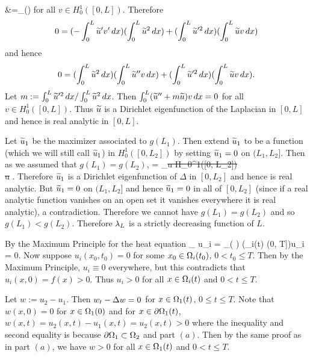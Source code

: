 &=\lim_{\vep {}}\bigg(\bigg)
\ea
for all $v \in H_{0}^{1}([0, L])$. Therefore
$$0 = (-\int_{0}^{L}\widetilde{u}'v'\, dx)(\int_{0}^{L}\widetilde{u}^{2}\, dx) + (\int_{0}^{L}\widetilde{u}'^{2}\, dx)(\int_{0}^{L}\widetilde{u}v\, dx)$$
and hence
$$0 = (\int_{0}^{L}\widetilde{u}^{2}\, dx)(\int_{0}^{L}\widetilde{u}''v\, dx) + (\int_{0}^{L}\widetilde{u}'^{2}\, dx)(\int_{0}^{L}\widetilde{u}v\, dx).$$
Let $m :=\int_{0}^{L}\widetilde{u}'^{2}\, dx/\int_{0}^{L}\widetilde{u}^{2}\, dx$. Then $\int_{0}^{L}(\widetilde{u}'' + m\widetilde{u})v\, dx = 0$ for all $v \in H_{0}^{1}([0, L])$.
Thus $\widetilde{u}$ is a Dirichlet eigenfunction of the Laplacian in $[0, L]$ and hence is real analytic in $[0, L]$.

Let $\widetilde{u}_{1}$ be the maximizer associated to $g(L_{1})$. Then extend $\widetilde{u}_{1}$ to be a function (which we will still call $\widetilde{u}_{1}$)
in $H_{0}^{1}([0, L_{2}])$ by setting $\widetilde{u}_{1} = 0$
on $(L_{1}, L_{2}]$. Then as we assumed that $g(L_{1}) = g(L_{2})$,
\ba
{} = \max_{\st{u \in H_{0}^{1}([0, L_{2}])\\u \not{}}}.
\ea
Therefore $\widetilde{u}_{1}$ is a Dirichlet eigenfunction of $\Delta$ in $[0, L_{2}]$ and hence
is real analytic. But $\widetilde{u}_{1}= 0$ on $(L_{1}, L_{2}]$ and hence $\widetilde{u}_{1} = 0$ in all of $[0, L_{2}]$ (since
if a real analytic function vanishes on an open set it vanishes everywhere it is real analytic), a contradiction.
Therefore we cannot have $g(L_{1}) = g(L_{2})$ and so $g(L_{1}) < g(L_{2})$. Therefore $\lambda_{L}$ is a strictly decreasing function of $L$.
\hq

\label{s078}
By the Maximum Principle for the heat equation
\ba
\min_{ \times [0, T]}u_{i} = \min_{( \times [0, T]) \bs (\Om_{i}(t) \times (0, T])}u_{i} = 0.
\ea
Now suppose $u_{i}(x_0, t_0) = 0$ for some $x_0 \in \Omega_{i}(t_0)$, $0 < t_0 \leq T$.
Then by the Maximum Principle, $u_i \equiv 0$ everywhere, but this contradicts that
$u_{i}(x, 0) = f(x) > 0$. Thus $u_{i} > 0$ for all $x \in \Omega_{i}(t)$ and $0 < t \leq T$.
\hq

Let $w:= u_{2} - u_{1}$. Then
$w_{t} - \Delta w = 0$ for $x \in \Omega_{1}(t)$, $0 \leq t \leq T$.
Note that $w(x, 0) = 0$ for $x \in \Omega_{1}(0)$ and for $x \in \partial\Omega_{1}(t)$,
$w(x, t) = u_{2}(x, t) - u_{1}(x, t) = u_{2}(x, t) > 0$
where the inequality and second equality is because $\partial\Omega_{1} \subset \Omega_{2}$ and part $(a)$.
Then by the same proof as in part $(a)$, we have $w > 0$ for all $x \in \Omega_{1}(t)$ and $0 < t \leq T$.
\hq
